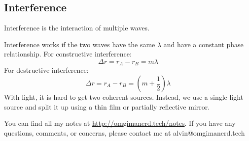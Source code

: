 \documentclass{math}
\begin{document}
\subsection*{Interference}
Interference is the interaction of multiple waves.
\begin{center}
\end{center}
Interference works if the two waves have the same \( \lambda \) and have a
constant phase relationship. For constructive interference:
\[ \Delta r = r_A-r_B = m\lambda \]
For destructive interference:
\[ \Delta r = r_A-r_B = (m+\frac{1}{2})\lambda \]
With light, it is hard to get two coherent sources. Instead, we use a single
light source and split it up using a thin film or partially reflective mirror.


\begin{center}
  You can find all my notes at \url{http://omgimanerd.tech/notes}. If you have
  any questions, comments, or concerns, please contact me at
  alvin@omgimanerd.tech
\end{center}
\end{document}
